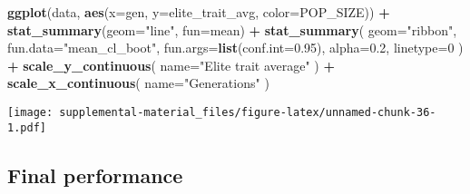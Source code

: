 \documentclass[]{book}
\newenvironment{Shaded}{\begin{snugshade}}{\end{snugshade}}
\newcommand{\DataTypeTok}[1]{\textcolor[rgb]{0.13,0.29,0.53}{#1}}
\newcommand{\DecValTok}[1]{\textcolor[rgb]{0.00,0.00,0.81}{#1}}
\newcommand{\FloatTok}[1]{\textcolor[rgb]{0.00,0.00,0.81}{#1}}
\newcommand{\KeywordTok}[1]{\textcolor[rgb]{0.13,0.29,0.53}{\textbf{#1}}}
\newcommand{\NormalTok}[1]{#1}
\newcommand{\OperatorTok}[1]{\textcolor[rgb]{0.81,0.36,0.00}{\textbf{#1}}}
\newcommand{\StringTok}[1]{\textcolor[rgb]{0.31,0.60,0.02}{#1}}
\begin{document}
\begin{Shaded}
\begin{Highlighting}[]
\KeywordTok{ggplot}\NormalTok{(data, }\KeywordTok{aes}\NormalTok{(}\DataTypeTok{x=}\NormalTok{gen, }\DataTypeTok{y=}\NormalTok{elite_trait_avg, }\DataTypeTok{color=}\NormalTok{POP_SIZE)) }\OperatorTok{+}
\StringTok{  }\KeywordTok{stat_summary}\NormalTok{(}\DataTypeTok{geom=}\StringTok{"line"}\NormalTok{, }\DataTypeTok{fun=}\NormalTok{mean) }\OperatorTok{+}
\StringTok{  }\KeywordTok{stat_summary}\NormalTok{(}
    \DataTypeTok{geom=}\StringTok{"ribbon"}\NormalTok{,}
    \DataTypeTok{fun.data=}\StringTok{"mean_cl_boot"}\NormalTok{,}
    \DataTypeTok{fun.args=}\KeywordTok{list}\NormalTok{(}\DataTypeTok{conf.int=}\FloatTok{0.95}\NormalTok{),}
    \DataTypeTok{alpha=}\FloatTok{0.2}\NormalTok{,}
    \DataTypeTok{linetype=}\DecValTok{0}
\NormalTok{  ) }\OperatorTok{+}
\StringTok{  }\KeywordTok{scale_y_continuous}\NormalTok{(}
    \DataTypeTok{name=}\StringTok{"Elite trait average"}
\NormalTok{  ) }\OperatorTok{+}
\StringTok{  }\KeywordTok{scale_x_continuous}\NormalTok{(}
    \DataTypeTok{name=}\StringTok{"Generations"}
\NormalTok{  )}
\end{Highlighting}
\end{Shaded}

\texttt{[image: supplemental-material\_files/figure-latex/unnamed-chunk-36-1.pdf]}

\hypertarget{final-performance-2}{%
\subsection{Final performance}\label{final-performance-2}}
\end{document}
